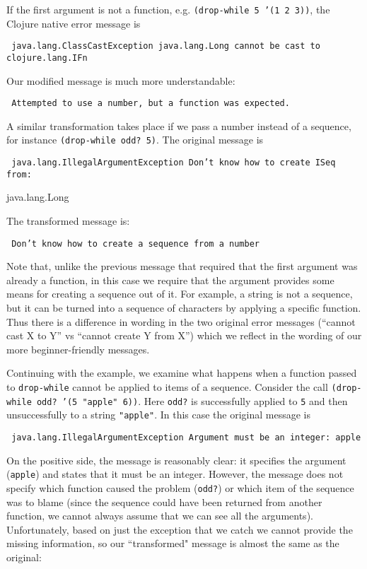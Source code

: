 \documentclass[submission,copyright,creativecommons]{eptcs}
\newcommand{\clocode}[1]{{\tt {#1}}}
\begin{document}
If the first argument is not a function, e.g. \clocode{(drop-while 5 '(1 2 3))}, the Clojure native error message is 

{\tt
java.lang.ClassCastException java.lang.Long cannot be cast to clojure.lang.IFn
}

\noindent
Our modified message is much more understandable:

{\tt
Attempted to use a number, but a function was expected.
}

\noindent
A similar transformation takes place if we pass a number instead of a sequence, for instance \clocode{(drop-while odd? 5)}. The original message is 

{\tt
java.lang.IllegalArgumentException Don't know how to create ISeq from: 

java.lang.Long
}

\noindent
The transformed message is:

{\tt
Don't know how to create a sequence from a number
}

\noindent
Note that, unlike the previous message that required that the first argument was already a function, in this case we require that the argument provides some means for creating a sequence out of it. For example, a string is not a sequence, but it can be turned into a sequence of characters by applying a specific function. Thus there is a difference in wording in the two original error messages (``cannot cast X to Y'' vs ``cannot create Y from X'')  which we reflect in the wording of our more beginner-friendly messages. 

Continuing with the example, we examine what happens when a function passed to \clocode{drop-while} cannot be applied to items of a sequence. Consider the call \clocode{(drop-while odd? '(5 "apple" 6))}. Here \clocode{odd?} is successfully applied to \clocode{5} and then unsuccessfully to a string \clocode{"apple"}. In this case the original message is 

{\tt
java.lang.IllegalArgumentException Argument must be an integer: apple
}

\noindent
On the positive side, the message is reasonably clear: it specifies the argument (\clocode{apple}) and states that it must be an integer. However, the message does not specify which function caused the problem (\clocode{odd?}) or which item of the sequence was to blame (since the sequence could have been returned from another function, we cannot always assume that we can see all the arguments). Unfortunately, based on just the exception that we catch we cannot provide the missing information, so our ``transformed" message is almost the same as the original: 
\end{document}
